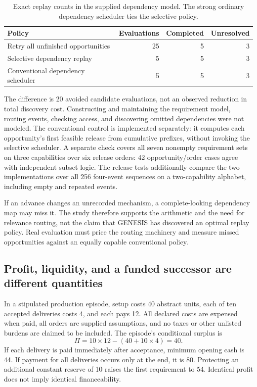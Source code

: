 \documentclass[11pt,letterpaper]{article}
\theoremstyle{remark}\newtheorem{remark}{Remark}[section]
\begin{document}
\begin{table}[htbp]
\caption{Exact replay counts in the supplied dependency model. The strong ordinary dependency scheduler ties the selective policy.}
\begin{tabularx}{\linewidth}{Yrrr}
\toprule
\textbf{Policy}&\textbf{Evaluations}&\textbf{Completed}&\textbf{Unresolved}\\\midrule
Retry all unfinished opportunities&25&5&3\\
Selective dependency replay&5&5&3\\
Conventional dependency scheduler&5&5&3\\\bottomrule
\end{tabularx}
\end{table}

The difference is 20 avoided candidate evaluations, not an observed reduction in total discovery cost. Constructing and maintaining the requirement model, routing events, checking access, and discovering omitted dependencies were not modeled. The conventional control is implemented separately: it computes each opportunity's first feasible release from cumulative prefixes, without invoking the selective scheduler. A separate check covers all seven nonempty requirement sets on three capabilities over six release orders: 42 opportunity/order cases agree with independent subset logic. The release tests additionally compare the two implementations over all 256 four-event sequences on a two-capability alphabet, including empty and repeated events.

If an advance changes an unrecorded mechanism, a complete-looking dependency map may miss it. The study therefore supports the arithmetic and the need for relevance routing, not the claim that GENESIS has discovered an optimal replay policy. Real evaluation must price the routing machinery and measure missed opportunities against an equally capable conventional policy.

\subsection{Profit, liquidity, and a funded successor are different quantities}
In a stipulated production episode, setup costs 40 abstract units, each of ten accepted deliveries costs 4, and each pays 12. All declared costs are expensed when paid, all orders are supplied assumptions, and no taxes or other unlisted burdens are claimed to be included. The episode's conditional surplus is
\begin{equation}
\Pi=10\times12-(40+10\times4)=40.
\end{equation}
If each delivery is paid immediately after acceptance, minimum opening cash is 44. If payment for all deliveries occurs only at the end, it is 80. Protecting an additional constant reserve of 10 raises the first requirement to 54. Identical profit does not imply identical financeability.
\end{document}
